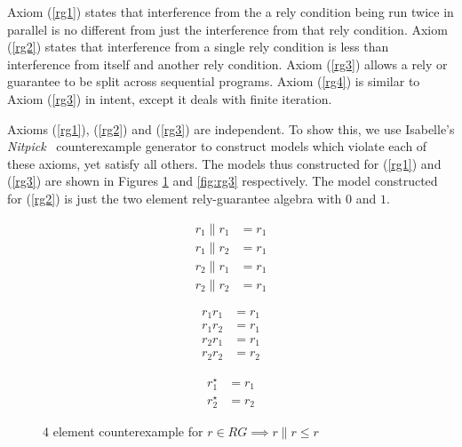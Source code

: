 \documentclass{llncs}
\begin{document}

Axiom (\ref{rg1}) states that interference from the a rely condition
being run twice in parallel is no different from just the
interference from that rely condition. Axiom (\ref{rg2}) states that
interference from a single rely condition is less than interference
from itself and another rely condition. Axiom (\ref{rg3}) allows a
rely or guarantee to be split across sequential programs. Axiom
(\ref{rg4}) is similar to Axiom (\ref{rg3}) in intent, except it deals
with finite iteration.

Axioms (\ref{rg1}), (\ref{rg2}) and (\ref{rg3}) are independent. To
show this, we use Isabelle's
\emph{Nitpick}~\cite{blanchette_nitpick:_2010} counterexample generator
to construct models which violate each of these axioms, yet satisfy
all others. The models thus constructed for (\ref{rg1}) and
(\ref{rg3}) are shown in Figures \ref{fig:rg1} and \ref{fig:rg3}
respectively. The model constructed for (\ref{rg2}) is just the two
element rely-guarantee algebra with $0$ and $1$.

\begin{figure}[H]
\centering
\begin{minipage}{0.24\textwidth}
\end{minipage}
\begin{minipage}{0.24\textwidth}
\begin{align*}
r_1 \| r_1 &= r_1\\
r_1 \| r_2 &= r_1\\
r_2 \| r_1 &= r_1\\
r_2 \| r_2 &= r_1
\end{align*}
\end{minipage}
\begin{minipage}{0.24\textwidth}
\begin{align*}
r_1r_1 &= r_1\\
r_1r_2 &= r_1\\
r_2r_1 &= r_1\\
r_2r_2 &= r_2
\end{align*}
\end{minipage}
\begin{minipage}{0.24\textwidth}
\begin{align*}
r_1^\star &= r_1\\
r_2^\star &= r_2
\end{align*}
\end{minipage}
\caption{4 element counterexample for $r \in RG \implies r\|r \le r$}
\label{fig:rg1}
\end{figure}
\end{document}
